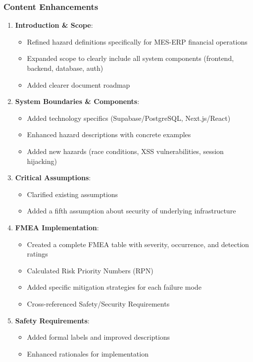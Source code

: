 \documentclass{article}
\begin{document}
\subsubsection{Content Enhancements}
\begin{enumerate}
  \item \textbf{Introduction \& Scope}:
  \begin{itemize}
    \item Refined hazard definitions specifically for MES-ERP financial operations
    \item Expanded scope to clearly include all system components (frontend, backend, database, auth)
    \item Added clearer document roadmap
  \end{itemize}

  \item \textbf{System Boundaries \& Components}:
  \begin{itemize}
    \item Added technology specifics (Supabase/PostgreSQL, Next.js/React)
    \item Enhanced hazard descriptions with concrete examples
    \item Added new hazards (race conditions, XSS vulnerabilities, session hijacking)
  \end{itemize}

  \item \textbf{Critical Assumptions}:
  \begin{itemize}
    \item Clarified existing assumptions
    \item Added a fifth assumption about security of underlying infrastructure
  \end{itemize}

  \item \textbf{FMEA Implementation}:
  \begin{itemize}
    \item Created a complete FMEA table with severity, occurrence, and detection ratings
    \item Calculated Risk Priority Numbers (RPN)
    \item Added specific mitigation strategies for each failure mode
    \item Cross-referenced Safety/Security Requirements
  \end{itemize}

  \item \textbf{Safety Requirements}:
  \begin{itemize}
    \item Added formal labels and improved descriptions
    \item Enhanced rationales for implementation
  \end{itemize}


\end{enumerate}
\end{document}
